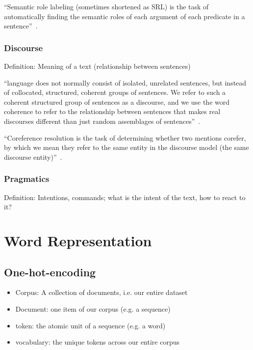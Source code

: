 \documentclass[11pt]{article}
\begin{document}
``Semantic role labeling (sometimes shortened as SRL) is the task of automatically finding the semantic roles of each argument of each predicate in a sentence''~\cite{book-speech-and-language-processing}.

\subsubsection{Discourse}

Definition: Meaning of a text (relationship between sentences)

``language does not normally consist of isolated, unrelated sentences, but instead of collocated, structured, coherent groups of sentences. We refer to such a coherent structured group of sentences as a discourse, and we use the word coherence to refer to the relationship between sentences that makes real discourses different than just random assemblages of sentences''~\cite{book-speech-and-language-processing}.

``Coreference resolution is the task of determining whether two mentions corefer, by which we mean they refer to the same entity in the discourse model (the same discourse entity)''~\cite{book-speech-and-language-processing}.

\subsubsection{Pragmatics}

Definition: Intentions, commands; what is the intent of the text, how to react to it?

\section{Word Representation}

\subsection{One-hot-encoding}

\begin{itemize}
    \item Corpus: A collection of documents, i.e. our entire dataset
    \item Document: one item of our corpus (e.g. a sequence)
    \item token: the atomic unit of a sequence (e.g. a word)
    \item vocabulary: the unique tokens across our entire corpus
\end{itemize}
\end{document}
